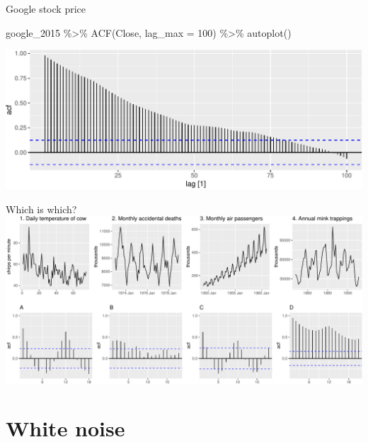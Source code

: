 \documentclass[14pt,ignorenonframetext,aspectratio=169]{beamer}
\newenvironment{Shaded}{\begin{snugshade}}{\end{snugshade}}
\newcommand{\AttributeTok}[1]{\textcolor[rgb]{0.77,0.63,0.00}{#1}}
\newcommand{\DecValTok}[1]{\textcolor[rgb]{0.00,0.00,0.81}{#1}}
\newcommand{\FunctionTok}[1]{\textcolor[rgb]{0.00,0.00,0.00}{#1}}
\newcommand{\NormalTok}[1]{#1}
\newcommand{\SpecialCharTok}[1]{\textcolor[rgb]{0.00,0.00,0.00}{#1}}
\renewenvironment{Shaded}{\color{black}\begin{snugshade}\color{black}}{\end{snugshade}}
\renewenvironment{Shaded}{\color{black}\fontsize{10}{10}\sf\begin{snugshade}\color{black}}{\end{snugshade}}
\begin{document}
\begin{frame}[fragile]{Google stock price}
\protect\hypertarget{google-stock-price-3}{}
\fontsize{10}{10}\sf

\begin{Shaded}
\begin{Highlighting}[]
\NormalTok{google\_2015 }\SpecialCharTok{\%\textgreater{}\%}
  \FunctionTok{ACF}\NormalTok{(Close, }\AttributeTok{lag\_max =} \DecValTok{100}\NormalTok{) }\SpecialCharTok{\%\textgreater{}\%}
  \FunctionTok{autoplot}\NormalTok{()}
\end{Highlighting}
\end{Shaded}

\includegraphics{2-tsgraphics_files/figure-beamer/unnamed-chunk-31-1.pdf}
\end{frame}

\begin{frame}{Which is which?}
\protect\hypertarget{which-is-which}{}
\includegraphics[width=15cm]{2-tsgraphics_files/figure-beamer/unnamed-chunk-32-1}
\end{frame}

\hypertarget{white-noise}{%
\section{White noise}\label{white-noise}}
\end{document}
